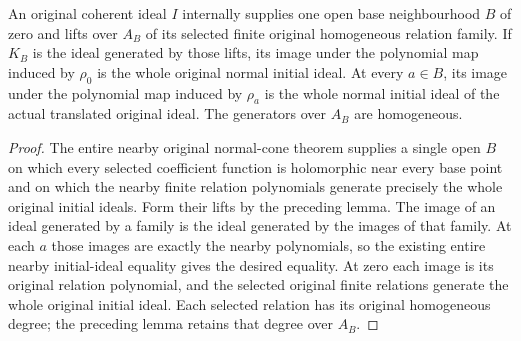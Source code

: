 \begin{theorem}
\label{hir:relative-normal-coefficient-function-original-initial-family}
\leanok
{}
An original coherent ideal $I$ internally supplies one open base neighbourhood
$B$ of zero and lifts over $A_B$ of its selected finite original homogeneous
relation family. If $K_B$ is the ideal generated by those lifts, its image under
the polynomial map induced by $\rho_0$ is the whole original normal initial
ideal. At every $a\in B$, its image under the polynomial map induced by
$\rho_a$ is the whole normal initial ideal of the actual translated original
ideal. The generators over $A_B$ are homogeneous.
\end{theorem}
\begin{proof}
The entire nearby original normal-cone theorem supplies a single open $B$ on
which every selected coefficient function is holomorphic near every base point
and on which the nearby finite relation polynomials generate precisely the
whole original initial ideals. Form their lifts by the preceding lemma. The
image of an ideal generated by a family is the ideal generated by the images
of that family. At each $a$ those images are exactly the nearby polynomials,
so the existing entire nearby initial-ideal equality gives the desired
equality. At zero each image is its original relation polynomial, and the
selected original finite relations generate the whole original initial ideal.
Each selected relation has its original homogeneous degree; the preceding
lemma retains that degree over $A_B$.
\end{proof}


